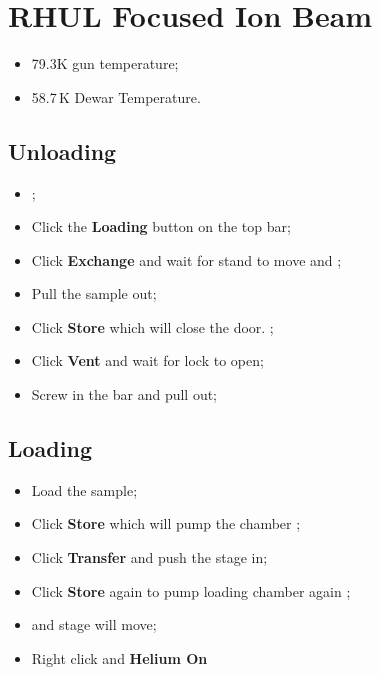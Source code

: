 \section{RHUL Focused Ion Beam}

\begin{framed}\noindent
  \begin{itemize}
  \item 79.3K gun temperature;
  \item 58.7\,K Dewar Temperature.
  \end{itemize}
\end{framed}

\subsection{Unloading}

\begin{itemize}
\item {};
\item Click the \textbf{Loading} button on the top bar;
\item Click \textbf{Exchange} and wait for stand to move and ;
\item Pull the sample out;
\item  Click \textbf{Store}  which will  close  the door.   ;
\item Click \textbf{Vent} and wait for lock to open;
\item Screw in the bar and pull out;
\end{itemize}

\subsection{Loading}
\begin{itemize}
\item Load the sample;
\item Click \textbf{Store} which will pump  the chamber \ira {};
\item Click \textbf{Transfer} and push the stage in;
\item Click  \textbf{Store} again to  pump loading chamber again  \ira {};
\item {} and stage will move;
\item Right click and \textbf{Helium On}
\end{itemize}

